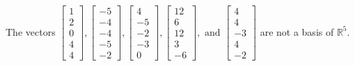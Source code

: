 \begin{exercise}
\begin{exerciseStatement}
  \end{exerciseStatement}
  \begin{exerciseAnswer}
   The vectors \(\left[\begin{array}{r}
1 \\
2 \\
0 \\
4 \\
4
\end{array}\right] , \left[\begin{array}{r}
-5 \\
-4 \\
-4 \\
-5 \\
-2
\end{array}\right] , \left[\begin{array}{r}
4 \\
-5 \\
-2 \\
-3 \\
0
\end{array}\right] , \left[\begin{array}{r}
12 \\
6 \\
12 \\
3 \\
-6
\end{array}\right] , \text{ and } \left[\begin{array}{r}
4 \\
4 \\
-3 \\
4 \\
-2
\end{array}\right]\) 
  	 are not  a basis of \(\mathbb{R}^5\).
  


  \end{exerciseAnswer}
\end{exercise}